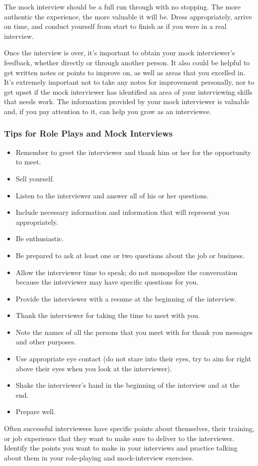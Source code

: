 The mock interview should be a full run through with no stopping. The more authentic the experience, the more valuable it will be. Dress appropriately, arrive on time, and conduct yourself from start to finish as if you were in a real interview.

Once the interview is over, it's important to obtain your mock interviewer's feedback, whether directly or through another person. It also could be helpful to get written notes or points to improve on, as well as areas that you excelled in. It's extremely important not to take any notes for improvement personally, nor to get upset if the mock interviewer has identified an area of your interviewing skills that needs work. The information provided by your mock interviewer is valuable and, if you pay attention to it, can help you grow as an interviewee.

\subsubsection*{Tips for Role Plays and Mock Interviews}
\begin{itemize}[leftmargin=1.0cm]
	\item Remember to greet the interviewer and thank him or her for the opportunity to meet.
	\item Sell yourself.
	\item Listen to the interviewer and answer all of his or her questions.
	\item Include necessary information and information that will represent you appropriately.
	\item Be enthusiastic.
	\item Be prepared to ask at least one or two questions about the job or business.
	\item Allow the interviewer time to speak; do not monopolize the conversation because the interviewer may have specific questions for you.
	\item Provide the interviewer with a resume at the beginning of the interview.
	\item Thank the interviewer for taking the time to meet with you.
	\item Note the names of all the persons that you meet with for thank you messages and other purposes.
	\item Use appropriate eye contact (do not stare into their eyes, try to aim for right above their eyes when you look at the interviewer).
	\item Shake the interviewer's hand in the beginning of the interview and at the end.
	\item Prepare well.
\end{itemize}
Often successful interviewees have specific points about themselves, their training, or job experience that they want to make sure to deliver to the interviewer. Identify the points you want to make in your interviews and practice talking about them in your role-playing and mock-interview exercises.

